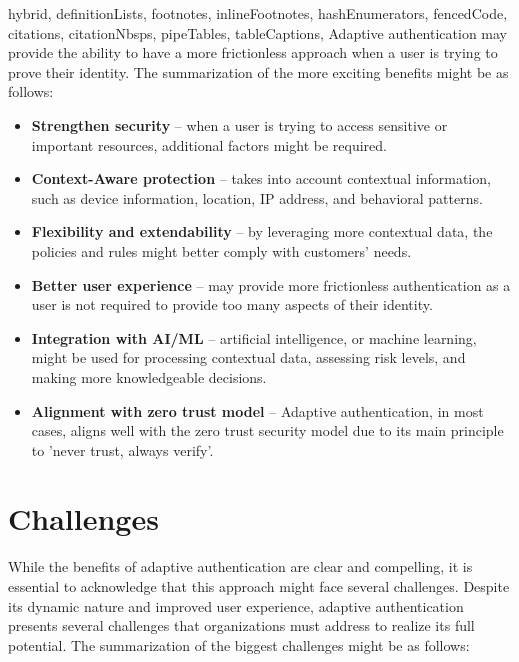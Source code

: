 \documentclass[
  digital,     %
  oneside,     %
  nosansbold,  %
  nocolorbold, %
  lof,         %
  lot,         %
]{fithesis4}
\begin{document}
\begin{markdown*}{%
  hybrid,
  definitionLists,
  footnotes,
  inlineFootnotes,
  hashEnumerators,
  fencedCode,
  citations,
  citationNbsps,
  pipeTables,
  tableCaptions,
}
Adaptive authentication may provide the ability to have a more frictionless approach when a user is trying to prove their identity.
\cite{intro-silverfort}\cite{intro-descope}
\newline
\newline
The summarization of the more exciting benefits might be as follows:

\begin{itemize}
    \item \textbf{Strengthen security} -- when a user is trying to access sensitive or important resources, additional factors might be required.
    \item \textbf{Context-Aware protection} -- takes into account contextual information, such as device information, location, IP address, and behavioral patterns.
    \item \textbf{Flexibility and extendability} -- by leveraging more contextual data, the policies and rules might better comply with customers' needs.
    \item \textbf{Better user experience} -- may provide more frictionless authentication as a user is not required to provide too many aspects of their identity.
    \item \textbf{Integration with AI/ML} -- artificial intelligence, or machine learning, might be used for processing contextual data, assessing risk levels, and making more knowledgeable decisions.
    \item \textbf{Alignment with zero trust model} -- Adaptive authentication, in most cases, aligns well with the zero trust security model due to its main principle to 'never trust, always verify'. \cite{intro-incognia}
\end{itemize}

\newpage
\section{Challenges}
While the benefits of adaptive authentication are clear and compelling, it is essential to acknowledge that this approach might face several challenges.
Despite its dynamic nature and improved user experience, adaptive authentication presents several challenges that organizations must address to realize its full potential.
\newline
\newline
The summarization of the biggest challenges might be as follows:


\end{markdown*}
\end{document}
